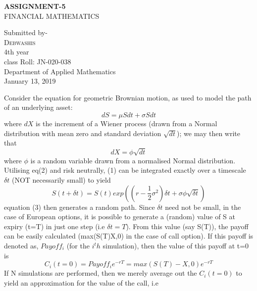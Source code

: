 \documentclass[14pt,a4paper]{article}
\begin{document}
	\begin{titlepage}
	\begin{center}
	\Huge{\bfseries ASSIGNMENT-5}\\
	[5mm]
	\Large{FINANCIAL MATHEMATICS}\\
	[15cm]
	\end{center}
	
	\begin{flushright}
	Submitted by-\\
	[2mm]	
	\textsc{\Large Debwashis}\\
	[0.1cm]	
	4th year\\
	class Roll: JN-020-038\\
	Department of Applied Mathematics\\
	January 13, 2019\\
	\end{flushright}
	\end{titlepage}
	\noindent Consider the equation for geometric Brownian motion, as used to model the path of an underlying asset: 
\begin{equation}
dS=\mu Sdt+\sigma Sdt
\end{equation}		
where $dX$ is the increment of a Wiener process (drawn from a Normal distribution with mean zero and standard deviation $\sqrt{dt}$); we may then write that
\begin{equation}
dX=\phi \sqrt{dt}
\end{equation}
	where $\phi$ is a random variable drawn from a normalised Normal distribution. Utilising eq(2) and risk neutrally, (1) can be integrated exactly over a timescale $\delta t$ (NOT necessarily small) to yield 
	\begin{equation}
	S(t+\delta t) = S(t) exp((r-\frac{1}{2}\sigma^2)\delta t+\sigma \phi \sqrt{\delta t})
	\end{equation}
	equation (3) then generates a random path. Since $\delta t$ need not be small, in the case of European options, it is possible to generate a (random) value of S at expiry (t=T) in just one step (i.e $\delta t=T$). From this value (say S(T)), the payoff can be easily calculated  (max(S(T)X,0) in the case of call option). If this payoff is denoted as, $Payoff_i$ (for the $i^th$ simulation), then the value of this payoff at t=0 is 
	\begin{equation}
	C_i(t=0)=Payoff_i{e^{-rT}}=max(S(T)-X,0)e^{-rT}
	\end{equation}
	If N simulations are performed, then we merely average out the $C_i(t=0)$ to yield  an approximation for the value of the call, i.e\\
\end{document}
